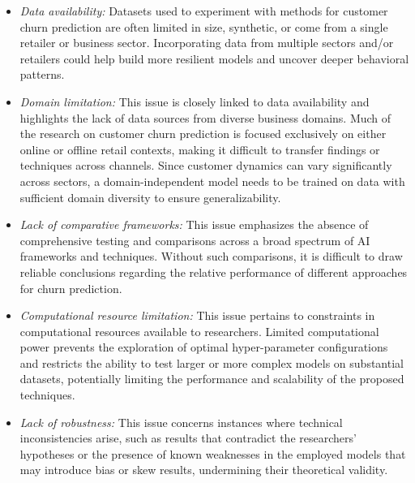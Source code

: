 \documentclass[preprint,12pt]{elsarticle}
\begin{document}
\begin{itemize}
    \item \textit{Data availability:} Datasets used to experiment with methods for customer churn prediction are often limited in size, synthetic, or come from a single retailer or business sector. Incorporating data from multiple sectors and/or retailers could help build more resilient models and uncover deeper behavioral patterns.

    \item \textit{Domain limitation:} This issue is closely linked to data availability and highlights the lack of data sources from diverse business domains. Much of the research on customer churn prediction is focused exclusively on either online or offline retail contexts, making it difficult to transfer findings or techniques across channels. Since customer dynamics can vary significantly across sectors, a domain-independent model needs to be trained on data with sufficient domain diversity to ensure generalizability.

    \item \textit{Lack of comparative frameworks:} This issue emphasizes the absence of comprehensive testing and comparisons across a broad spectrum of AI frameworks and techniques. Without such comparisons, it is difficult to draw reliable conclusions regarding the relative performance of different approaches for churn prediction.

    \item \textit{Computational resource limitation:} This issue pertains to constraints in computational resources available to researchers. Limited computational power prevents the exploration of optimal hyper-parameter configurations and restricts the ability to test larger or more complex models on substantial datasets, potentially limiting the performance and scalability of the proposed techniques.

    \item \textit{Lack of robustness:} This issue concerns instances where technical inconsistencies arise, such as results that contradict the researchers’ hypotheses or the presence of known weaknesses in the employed models that may introduce bias or skew results, undermining their theoretical validity.
\end{itemize}


\end{document}
